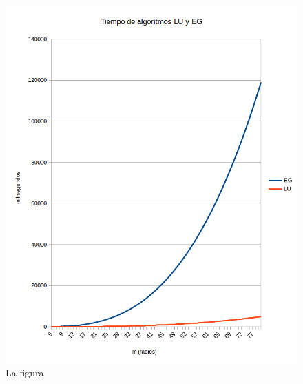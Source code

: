 \newpage

\begin{figure}[h]
  \center
  \includegraphics[scale=0.8]{imagenes/tiempoLUyEGsinDividir.png}
  \caption{La figura}
  \label{fig:luyeg}
\end{figure}







